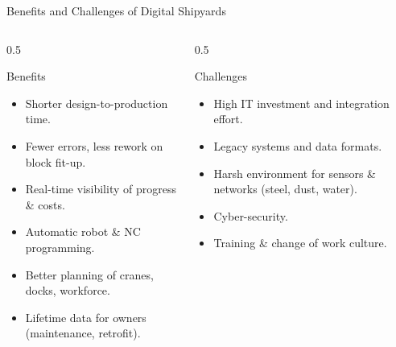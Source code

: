 \documentclass[aspectratio=169]{beamer}
\begin{document}
	\begin{frame}{Benefits and Challenges of Digital Shipyards}
		\begin{columns}[T]
			\begin{column}{0.5\textwidth}
				\begin{block}{Benefits}
					\begin{itemize}\small
						\item Shorter design-to-production time.
						\item Fewer errors, less rework on block fit-up.
						\item Real-time visibility of progress \& costs.
						\item Automatic robot \& NC programming.
						\item Better planning of cranes, docks, workforce.
						\item Lifetime data for owners (maintenance, retrofit).
					\end{itemize}
				\end{block}
			\end{column}
			\begin{column}{0.5\textwidth}
				\begin{block}{Challenges}
					\begin{itemize}\small
						\item High IT investment and integration effort.
						\item Legacy systems and data formats.
						\item Harsh environment for sensors \& networks (steel, dust, water).
						\item Cyber-security.
						\item Training \& change of work culture.
					\end{itemize}
				\end{block}
			\end{column}
		\end{columns}
	\end{frame}

\end{document}
